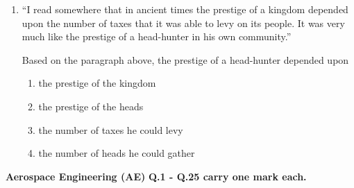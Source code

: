\documentclass{article}
\begin{document}
\begin{enumerate}[leftmargin=*]
\item “I read somewhere that in ancient times the prestige of a kingdom depended upon the number of taxes that it was able to levy on its people. It was very much like the prestige of a head-hunter in his own community.”

Based on the paragraph above, the prestige of a head-hunter depended upon
\begin{multicols}{2}
\begin{enumerate}
\item the prestige of the kingdom
\item the prestige of the heads
\item the number of taxes he could levy
\item the number of heads he could gather
\end{enumerate}
\end{multicols}
\end{enumerate}

\textbf{Aerospace Engineering (AE)}
\textbf{Q.1 - Q.25 carry one mark each.}
\end{document}
